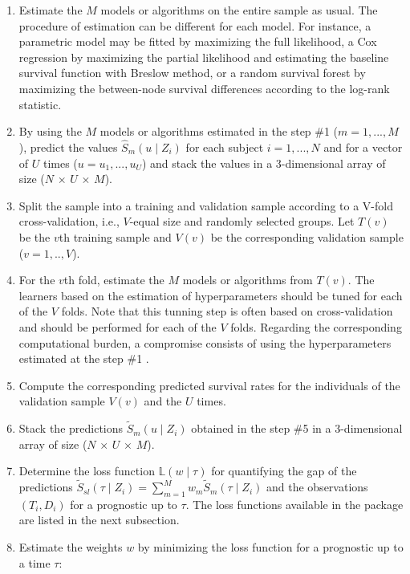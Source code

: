 \begin{enumerate}
\def\labelenumi{\arabic{enumi}.}
\item
  Estimate the \(M\) models or algorithms on the entire sample as usual. The procedure of estimation can be different for each model. For instance, a parametric model may be fitted by maximizing the full likelihood, a Cox regression by maximizing the partial likelihood and estimating the baseline survival function with Breslow method, or a random survival forest by maximizing the between-node survival differences according to the log-rank statistic.
\item
  By using the \(M\) models or algorithms estimated in the step \#1 (\(m=1,...,M\)), predict the values \(\hat{S}_m(u \mid Z_i)\) for each subject \(i=1, ...,N\) and for a vector of \(U\) times (\(u = u_1, ..., u_U\)) and stack the values in a 3-dimensional array of size (\(N\) \(\times\) \(U\) \(\times\) \(M\)).
\item
  Split the sample into a training and validation sample according to a V-fold cross-validation, i.e., \(V\)-equal size and randomly selected groups. Let \(T(v)\) be the \(v\)th training sample and \(V(v)\) be the corresponding validation sample (\(v = 1, .., V\)).
\item
  For the \(v\)th fold, estimate the \(M\) models or algorithms from \(T(v)\). The learners based on the estimation of hyperparameters should be tuned for each of the \(V\) folds. Note that this tunning step is often based on cross-validation and should be performed for each of the \(V\) folds. Regarding the corresponding computational burden, a compromise consists of using the hyperparameters estimated at the step \#1 \citep{florent2021}.
\item
  Compute the corresponding predicted survival rates for the individuals of the validation sample \(V(v)\) and the \(U\) times.
\item
  Stack the predictions \(\tilde{S}_m(u \mid Z_i)\) obtained in the step \#5 in a 3-dimensional array of size (\(N\) \(\times\) \(U\) \(\times\) \(M\)).
\item
  Determine the loss function \(\mathbb{L} (w \mid \tau)\) for quantifying the gap of the predictions \(\tilde{S}_{sl}( \tau \mid Z_i) = \sum_{m=1}^M w_m \tilde{S}_m(\tau \mid Z_i)\) and the observations \((T_i, D_i)\) for a prognostic up to \(\tau\). The loss functions available in the package are listed in the next subsection.
\item
  Estimate the weights \(w\) by minimizing the loss function for a prognostic up to a time \(\tau\):
\end{enumerate}

